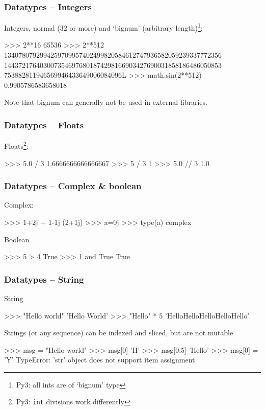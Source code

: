 \documentclass[xetex,10pt]{beamer}
\def\spacer{\vspace*{1em}}
\newcommand{\pypypy}[1]{\footnote[frame]{Py3: #1}}
\def\pythoni{\lstinline[language=pythontim]}
\begin{document}
\begin{frame}[fragile]
	\frametitle{Datatypes -- Integers}

	Integers, normal (32 or more) and `bignum' (arbitrary length)\pypypy{all ints are of `bignum' type}:

	\spacer

\begin{python}
>>> 2**16
65536
>>> 2**512
1340780792994259709957402499820584612747936582059239337772356
1443721764030073546976801874298166903427690031858186486050853
753882811946569946433649006084096L
>>> math.sin(2**512)
0.9905786583658018
\end{python}

	\spacer

Note that bignum can generally not be used in external libraries.
\end{frame}


\begin{frame}[fragile]
	\frametitle{Datatypes -- Floats}

Floats\pypypy{\pythoni{int} divisions work differently}:
\begin{python}
>>> 5.0 / 3
1.6666666666666667
>>> 5 / 3
1
>>> 5.0 // 3
1.0
\end{python}
\end{frame}


\begin{frame}[fragile]
	\frametitle{Datatypes -- Complex \& boolean}

Complex:
\begin{python}
>>> 1+2j + 1-1j
(2+1j)
>>> a=0j
>>> type(a)
complex
\end{python}

	\spacer

Boolean
\begin{python}
>>> 5 > 4
True
>>> 1 and True
True
\end{python}

\end{frame}


\begin{frame}[fragile]
	\frametitle{Datatypes -- String}

String
\begin{python}
>>> "Hello world"
'Hello World'
>>> "Hello" * 5
'HelloHelloHelloHelloHello'
\end{python}

	\spacer
\pause
	
Strings (or any sequence) can be indexed and sliced, but are not mutable
\begin{python}
>>> msg = "Hello world"
>>> msg[0]
'H'
>>> msg[0:5]
'Hello'
>>> msg[0] = 'Y'
TypeError: 'str' object does not support item assignment
\end{python}
\end{frame}
\end{document}
